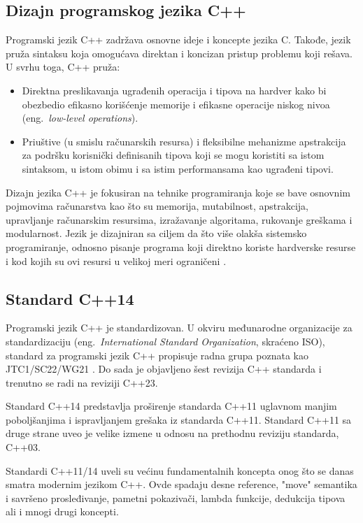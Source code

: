 \documentclass[12pt,oneside]{memoir}
\begin{document}
\subsection{Dizajn programskog jezika C++}

Programski jezik C++ zadr\v{z}ava osnovne ideje i koncepte jezika C. Takođe, jezik pru\v{z}a sintaksu koja omogu\'{c}ava direktan i koncizan pristup problemu koji re\v{s}ava.
U svrhu toga, C++ pru\v{z}a:
\begin{itemize}
  \item {Direktna preslikavanja ugrađenih operacija i tipova na hardver kako bi obezbedio efikasno kori\v{s}\'{c}enje memorije i efikasne operacije niskog nivoa (eng.~\textit{low-level operations}).}
  \item {Priu\v{s}tive (u smislu ra\v{c}unarskih resursa) i fleksibilne mehanizme apstrakcija za podr\v{s}ku korisni\v{c}ki definisanih tipova koji se mogu koristiti sa istom sintaksom, u istom obimu i sa istim performansama kao ugrađeni tipovi.}
\end{itemize}

Dizajn jezika C++ je fokusiran na tehnike programiranja koje se bave osnovnim pojmovima ra\v{c}unarstva kao \v{s}to su memorija, mutabilnost, apstrakcija, upravljanje ra\v{c}unarskim resursima, izra\v{z}avanje algoritama, rukovanje gre\v{s}kama i modularnost. Jezik je dizajniran sa ciljem da \v{s}to vi\v{s}e olak\v{s}a sistemsko programiranje, odnosno pisanje programa koji direktno koriste hardverske resurse i kod kojih su ovi resursi u velikoj meri ograni\v{c}eni \cite{TheC++ProgrammingLanguage}.


\subsection{Standard C++14}

Programski jezik C++ je standardizovan. U okviru međunarodne organizacije za standardizaciju (eng.~\textit{International Standard Organization}, skra\'{c}eno ISO), standard za programski jezik C++ propisuje radna grupa poznata kao JTC1/SC22/WG21 \cite{ISOWebsite}. Do sada je objavljeno \v{s}est revizija C++ standarda i trenutno se radi na reviziji C++23. 
\indent

Standard C++14 predstavlja pro\v{s}irenje standarda C++11 uglavnom manjim pobolj\v{s}anjima i ispravljanjem gre\v{s}aka iz standarda C++11. Standard C++11 sa druge strane uveo je velike izmene u odnosu na prethodnu reviziju standarda, C++03. \par
Standardi C++11/14 uveli su ve\'{c}inu fundamentalnih koncepta onog \v{s}to se danas smatra modernim jezikom C++. Ovde spadaju desne reference, "move" semantika i savr\v{s}eno prosleđivanje, pametni pokaziva\v{c}i, lambda funkcije, dedukcija tipova ali i mnogi drugi koncepti.
\end{document}
